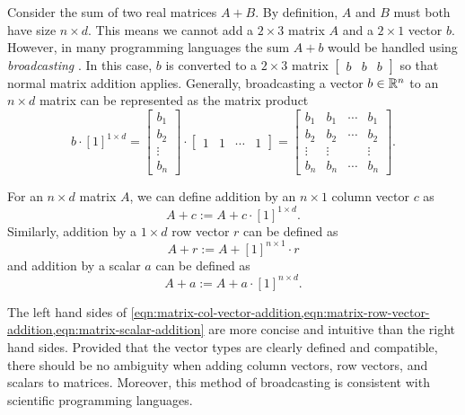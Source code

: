 \def\b{b}
Consider the sum of two real matrices \(A + B\).
By definition, \(A\) and \(B\) must both have size \(n \times d\).
This means we cannot add a \(2 \times 3\) matrix \(A\) and a \(2 \times 1\) vector \(\b\).
However, in many programming languages the sum \(A + \b\) would be handled using \textit{broadcasting} \cite{harris2020array}.
In this case, \(\b\) is converted to a \(2 \times 3\) matrix \(\begin{bmatrix} \b & \b & \b \end{bmatrix}\) so that normal matrix addition applies.
Generally, broadcasting a vector \(\b \in \RR^n\) to an \(n \times d\) matrix can be represented as the matrix product
\begin{equation}
    \label{eqn:vector-broadcasting}
    \b \cdot [1]^{1 \times d}
    = \begin{bmatrix}
        b_1 \\ b_2 \\ \vdots \\ b_n
    \end{bmatrix}
    \cdot
    \begin{bmatrix}
        1 & 1 & \cdots & 1
    \end{bmatrix}
    = \begin{bmatrix}
        b_1 & b_1 & \cdots & b_1 \\
        b_2 & b_2 & \cdots & b_2 \\
        \vdots & \vdots & & \vdots \\
        b_n & b_n & \cdots & b_n
    \end{bmatrix}.
\end{equation}
\begin{definition}
    \label{def:broadcast-addition}
    For an \(n \times d\) matrix \(A\), we can define addition by an \(n \times 1\) column vector \({c}\) as
    \begin{equation}
        \label{eqn:matrix-col-vector-addition}
        A + {c} := A + {c} \cdot [1]^{1 \times d}.
    \end{equation}
    Similarly, addition by a \(1 \times d\) row vector \({r}\) can be defined as
    \begin{equation}
        \label{eqn:matrix-row-vector-addition}
        A + {r} := A + [1]^{n \times 1} \cdot {r}
    \end{equation}
    and addition by a scalar \(a\) can be defined as
    \begin{equation}
        \label{eqn:matrix-scalar-addition}
        A + a := A + a \cdot [1]^{n \times d}.
    \end{equation}
\end{definition}

The left hand sides of \cref{eqn:matrix-col-vector-addition,eqn:matrix-row-vector-addition,eqn:matrix-scalar-addition} are more concise and intuitive than the right hand sides.
Provided that the vector types are clearly defined and compatible, there should be no ambiguity when adding column vectors, row vectors, and scalars to matrices.
Moreover, this method of broadcasting is consistent with scientific programming languages.
